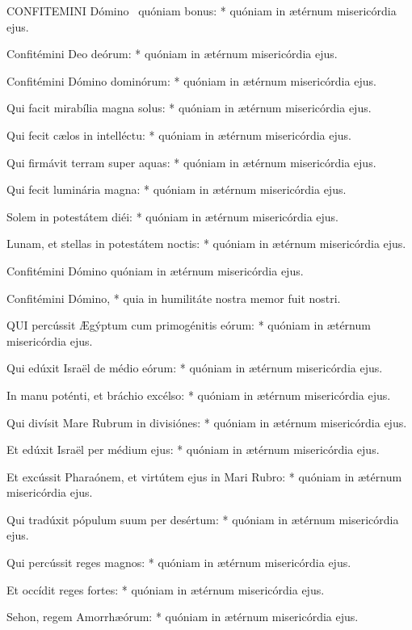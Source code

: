 
\lettrine[lines=2]{C}{ONFITEMINI} Dómino \textdagger\ quóniam bonus: * quóniam in ætérnum misericórdia ejus.

Confitémini Deo deórum: * quóniam in ætérnum misericórdia ejus.

Confitémini Dómino dominórum: * quóniam in ætérnum misericórdia ejus.

Qui facit mirabília magna solus: * quóniam in ætérnum misericórdia ejus.

Qui fecit cælos in intelléctu: * quóniam in ætérnum misericórdia ejus.

Qui firmávit terram super aquas: * quóniam in ætérnum misericórdia ejus.

Qui fecit luminária magna: * quóniam in ætérnum misericórdia ejus.

Solem in potestátem diéi: * quóniam in ætérnum misericórdia ejus.

Lunam, et stellas in potestátem noctis: * quóniam in ætérnum misericórdia ejus.

 Confitémini Dómino quóniam in ætérnum misericórdia ejus.

 Confitémini Dómino, * quia in humilitáte nostra memor fuit nostri.


\lettrine[lines=2]{Q}{UI} percússit Ægýptum cum primogénitis eórum: * quóniam in ætérnum misericórdia ejus.

Qui edúxit Israël de médio eórum: * quóniam in ætérnum misericórdia ejus.

In manu poténti, et bráchio excélso: * quóniam in ætérnum misericórdia ejus.

Qui divísit Mare Rubrum in divisiónes: * quóniam in ætérnum misericórdia ejus.

Et edúxit Israël per médium ejus: * quóniam in ætérnum misericórdia ejus.

Et excússit Pharaónem, et virtútem ejus in Mari Rubro: * quóniam in ætérnum misericórdia ejus.

Qui tradúxit pópulum suum per desértum: * quóniam in ætérnum misericórdia ejus.

Qui percússit reges magnos: * quóniam in ætérnum misericórdia ejus.

Et occídit reges fortes: * quóniam in ætérnum misericórdia ejus.

Sehon, regem Amorrhæórum: * quóniam in ætérnum misericórdia ejus.

